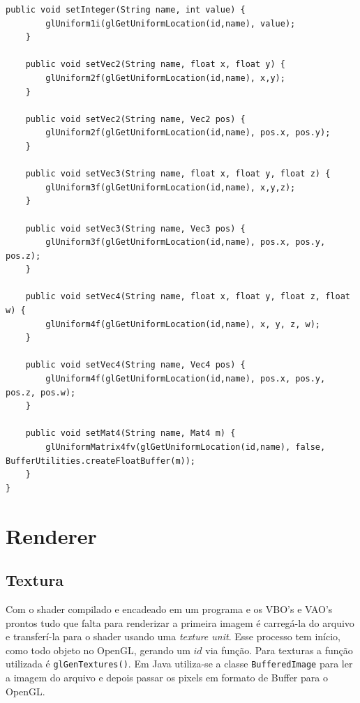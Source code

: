 \documentclass[12pt, 
openright, 
oneside, 
a4paper,    
brazil]{facom-ufu-abntex2}
\begin{document}
\begin{lstlisting}[caption=Shader class]
	public void setInteger(String name, int value) {
		glUniform1i(glGetUniformLocation(id,name), value);
	}
	
	public void setVec2(String name, float x, float y) {
		glUniform2f(glGetUniformLocation(id,name), x,y);
	}
	
	public void setVec2(String name, Vec2 pos) {
		glUniform2f(glGetUniformLocation(id,name), pos.x, pos.y);
	}
	
	public void setVec3(String name, float x, float y, float z) {
		glUniform3f(glGetUniformLocation(id,name), x,y,z);
	}
	
	public void setVec3(String name, Vec3 pos) {
		glUniform3f(glGetUniformLocation(id,name), pos.x, pos.y, pos.z);
	}
	
	public void setVec4(String name, float x, float y, float z, float w) {
		glUniform4f(glGetUniformLocation(id,name), x, y, z, w);
	}
	
	public void setVec4(String name, Vec4 pos) {
		glUniform4f(glGetUniformLocation(id,name), pos.x, pos.y, pos.z, pos.w);
	}

	public void setMat4(String name, Mat4 m) {
		glUniformMatrix4fv(glGetUniformLocation(id,name), false, BufferUtilities.createFloatBuffer(m));
	}
}
\end{lstlisting}
\section{Renderer}
\subsection{Textura}
Com o shader compilado e encadeado em um programa e os VBO's e VAO's prontos tudo que falta para renderizar a primeira imagem é carregá-la do arquivo e transferí-la para o shader usando uma \textit{texture unit}. Esse processo tem início, como todo objeto no OpenGL, gerando um $id$ via função. Para texturas a função utilizada é \texttt{glGenTextures()}. Em Java utiliza-se a classe \texttt{BufferedImage} para ler a imagem do arquivo e depois passar os pixels em formato de Buffer para o OpenGL.
\end{document}
